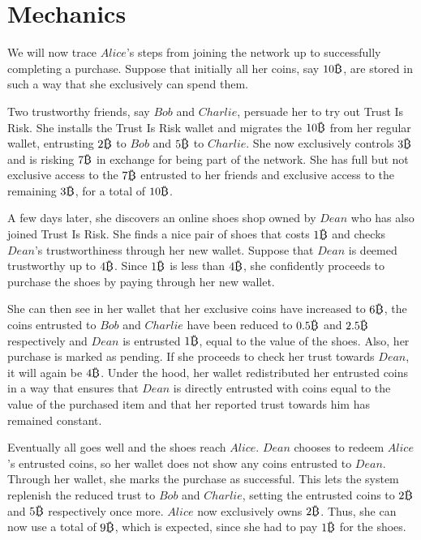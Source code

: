 \section{Mechanics}
  We will now trace $Alice$'s steps from joining the network up to successfully completing a purchase. Suppose that initially
  all her coins, say $10\bitcoin$, are stored in such a way that she exclusively can spend them.

  Two trustworthy friends, say $Bob$ and $Charlie$, persuade her to try out Trust Is Risk. She installs the Trust Is Risk
  wallet and migrates the $10\bitcoin$ from her regular wallet, entrusting $2\bitcoin$ to $Bob$ and $5\bitcoin$ to $Charlie$.
  She now exclusively controls $3\bitcoin$ and is risking $7\bitcoin$ in exchange for being part of the network. She has full
  but not exclusive access to the $7\bitcoin$ entrusted to her friends and exclusive access to the remaining $3\bitcoin$, for
  a total of $10\bitcoin$.

  A few days later, she discovers an online shoes shop owned by $Dean$ who has also joined Trust Is Risk. She finds a nice
  pair of shoes that costs $1\bitcoin$ and checks $Dean$'s trustworthiness through her new wallet. Suppose that $Dean$ is
  deemed trustworthy up to $4\bitcoin$. Since $1\bitcoin$ is less than $4\bitcoin$, she confidently proceeds to purchase the
  shoes by paying through her new wallet.

  She can then see in her wallet that her exclusive coins have increased to $6\bitcoin$, the coins entrusted to $Bob$ and
  $Charlie$ have been reduced to $0.5\bitcoin$ and $2.5\bitcoin$ respectively and $Dean$ is entrusted $1\bitcoin$, equal to
  the value of the shoes. Also, her purchase is marked as pending. If she proceeds to check her trust towards $Dean$, it will
  again be $4\bitcoin$. Under the hood, her wallet redistributed her entrusted coins in a way that ensures that $Dean$ is
  directly entrusted with coins equal to the value of the purchased item and that her reported trust towards him has remained
  constant.

  Eventually all goes well and the shoes reach $Alice$. $Dean$ chooses to redeem $Alice$'s entrusted coins, so her wallet
  does not show any coins entrusted to $Dean$. Through her wallet, she marks the purchase as successful. This lets the system
  replenish the reduced trust to $Bob$ and $Charlie$, setting the entrusted coins to $2\bitcoin$ and $5\bitcoin$ respectively
  once more. $Alice$ now exclusively owns $2\bitcoin$. Thus, she can now use a total of $9\bitcoin$, which is expected, since
  she had to pay $1\bitcoin$ for the shoes.
